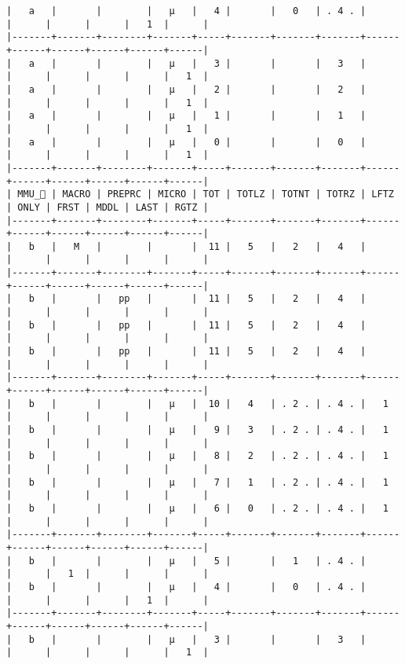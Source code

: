 \documentclass[varwidth=\maxdimen,margin=0.5cm,multi={verbatim}]{standalone}
\begin{document}
\begin{verbatim}
|   a   |       |        |   µ   |   4 |       |   0   | . 4 . |      |      |      |      |   1  |      |
|-------+-------+--------+-------+-----+-------+-------+-------+------+------+------+------+------+------|
|   a   |       |        |   µ   |   3 |       |       |   3   |      |      |      |      |      |   1  |
|   a   |       |        |   µ   |   2 |       |       |   2   |      |      |      |      |      |   1  |
|   a   |       |        |   µ   |   1 |       |       |   1   |      |      |      |      |      |   1  |
|   a   |       |        |   µ   |   0 |       |       |   0   |      |      |      |      |      |   1  |
|-------+-------+--------+-------+-----+-------+-------+-------+------+------+------+------+------+------|
| MMU_ | MACRO | PREPRC | MICRO | TOT | TOTLZ | TOTNT | TOTRZ | LFTZ | ONLY | FRST | MDDL | LAST | RGTZ |
|-------+-------+--------+-------+-----+-------+-------+-------+------+------+------+------+------+------|
|   b   |   M   |        |       |  11 |   5   |   2   |   4   |      |      |      |      |      |      |
|-------+-------+--------+-------+-----+-------+-------+-------+------+------+------+------+------+------|
|   b   |       |   pp   |       |  11 |   5   |   2   |   4   |      |      |      |      |      |      |
|   b   |       |   pp   |       |  11 |   5   |   2   |   4   |      |      |      |      |      |      |
|   b   |       |   pp   |       |  11 |   5   |   2   |   4   |      |      |      |      |      |      |
|-------+-------+--------+-------+-----+-------+-------+-------+------+------+------+------+------+------|
|   b   |       |        |   µ   |  10 |   4   | . 2 . | . 4 . |   1  |      |      |      |      |      |
|   b   |       |        |   µ   |   9 |   3   | . 2 . | . 4 . |   1  |      |      |      |      |      |
|   b   |       |        |   µ   |   8 |   2   | . 2 . | . 4 . |   1  |      |      |      |      |      |
|   b   |       |        |   µ   |   7 |   1   | . 2 . | . 4 . |   1  |      |      |      |      |      |
|   b   |       |        |   µ   |   6 |   0   | . 2 . | . 4 . |   1  |      |      |      |      |      |
|-------+-------+--------+-------+-----+-------+-------+-------+------+------+------+------+------+------|
|   b   |       |        |   µ   |   5 |       |   1   | . 4 . |      |      |   1  |      |      |      |
|   b   |       |        |   µ   |   4 |       |   0   | . 4 . |      |      |      |      |   1  |      |
|-------+-------+--------+-------+-----+-------+-------+-------+------+------+------+------+------+------|
|   b   |       |        |   µ   |   3 |       |       |   3   |      |      |      |      |      |   1  |

\end{verbatim}
\end{document}
